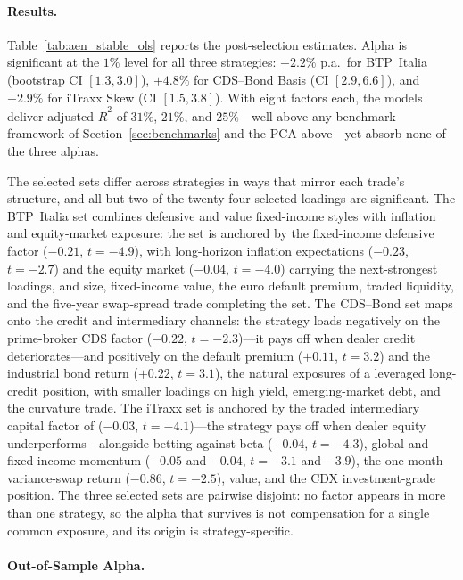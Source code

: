 \paragraph{Results.}

Table~\ref{tab:aen_stable_ols} reports the post-selection estimates.
Alpha is significant at the $1\%$ level for all three strategies:
$+2.2\%$ p.a.\ for BTP~Italia (bootstrap CI $[1.3, 3.0]$), $+4.8\%$
for CDS--Bond Basis (CI $[2.9, 6.6]$), and $+2.9\%$ for iTraxx
Skew (CI $[1.5, 3.8]$). With eight factors each, the models
deliver adjusted $\bar{R}^2$ of $31\%$, $21\%$, and $25\%$---well
above any benchmark framework of Section~\ref{sec:benchmarks} and the
PCA above---yet absorb none of the three alphas.

The selected sets differ across strategies in ways that mirror each
trade's structure, and all but two of the twenty-four selected
loadings are significant. The BTP~Italia set combines defensive and
value fixed-income styles with inflation and equity-market exposure:
the set is anchored by the fixed-income defensive factor ($-0.21$,
$t = -4.9$), with long-horizon inflation expectations ($-0.23$,
$t = -2.7$) and the equity market ($-0.04$, $t = -4.0$) carrying the
next-strongest loadings, and size,
fixed-income value, the euro default premium, traded liquidity, and
the five-year swap-spread trade completing the set. The CDS--Bond set
maps onto the credit and intermediary channels: the strategy loads
negatively on the prime-broker CDS factor ($-0.22$, $t = -2.3$)---it
pays off when dealer credit deteriorates---and positively on the
default premium ($+0.11$, $t = 3.2$) and the industrial bond return
($+0.22$, $t = 3.1$), the natural exposures of a leveraged
long-credit position, with smaller loadings on high yield,
emerging-market debt, and the curvature trade. The iTraxx set is
anchored by the traded intermediary capital factor of
\citet{he2017intermediary} ($-0.03$, $t = -4.1$)---the strategy pays
off when dealer equity underperforms---alongside
betting-against-beta ($-0.04$, $t = -4.3$), global and fixed-income
momentum ($-0.05$ and $-0.04$, $t = -3.1$ and $-3.9$), the one-month
variance-swap return ($-0.86$, $t = -2.5$), value, and the CDX
investment-grade position. The three selected sets are pairwise
disjoint: no factor appears in more than one strategy, so the alpha
that survives is not compensation for a single common exposure, and
its origin is strategy-specific.

\paragraph{Out-of-Sample Alpha.}

